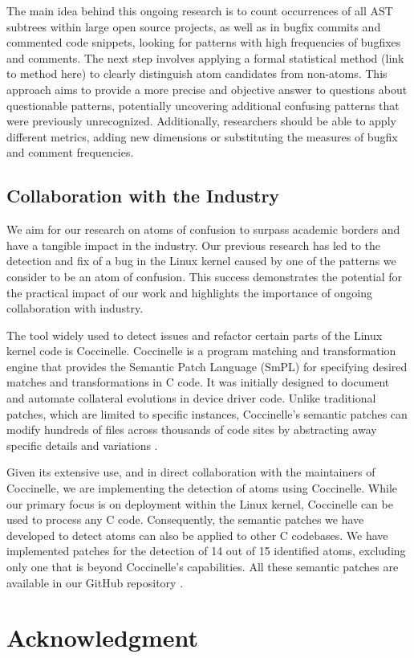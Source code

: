 \documentclass[conference]{IEEEtran}
\begin{document}
The main idea behind this ongoing research is to count occurrences of all AST subtrees within large open source projects, as well as in bugfix commits and commented code snippets, looking for patterns with high frequencies of bugfixes and comments. The next step involves applying a formal statistical method (link to method here) to clearly distinguish atom candidates from non-atoms. This approach aims to provide a more precise and objective answer to questions about questionable patterns, potentially uncovering additional confusing patterns that were previously unrecognized. Additionally, researchers should be able to apply different metrics, adding new dimensions or substituting the measures of bugfix and comment frequencies.


\subsection{Collaboration with the Industry}

We aim for our research on atoms of confusion to surpass academic borders and have a tangible impact in the industry. Our previous research has led to the detection and fix of a bug in the Linux kernel caused by one of the patterns we consider to be an atom of confusion. This success demonstrates the potential for the practical impact of our work and highlights the importance of ongoing collaboration with industry.

The tool widely used to detect issues and refactor certain parts of the Linux kernel code is Coccinelle. Coccinelle is a program matching and transformation engine that provides the Semantic Patch Language (SmPL) for specifying desired matches and transformations in C code. It was initially designed to document and automate collateral evolutions in device driver code. Unlike traditional patches, which are limited to specific instances, Coccinelle's semantic patches can modify hundreds of files across thousands of code sites by abstracting away specific details and variations \cite{coccinelle}.

Given its extensive use, and in direct collaboration with the maintainers of Coccinelle, we are implementing the detection of atoms using Coccinelle. While our primary focus is on deployment within the Linux kernel, Coccinelle can be used to process any C code. Consequently, the semantic patches we have developed to detect atoms can also be applied to other C codebases. We have implemented patches for the detection of 14 out of 15 identified atoms, excluding only one that is beyond Coccinelle's capabilities. All these semantic patches are available in our GitHub repository \cite{githubcocci}. 


\section*{Acknowledgment}
\end{document}
